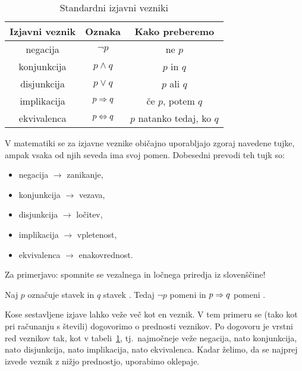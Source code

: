 		\begin{table}[!ht]
			\centering
			\begin{tabular}{|ccc|}
				\hline
				\textbf{Izjavni veznik} & \textbf{Oznaka} & \textbf{Kako preberemo} \\
				\hline
				negacija & $\lnot{p}$ & ne $p$ \\
				konjunkcija & $p \land q$ & $p$ in $q$ \\
				disjunkcija & $p \lor q$ & $p$ ali $q$ \\
				implikacija & $p \Rightarrow q$ & če $p$, potem $q$ \\
				ekvivalenca & $p \Leftrightarrow q$ & $p$ natanko tedaj, ko $q$ \\
				\hline
			\end{tabular}
			\caption{Standardni izjavni vezniki}\label{TABELA: Standardni izjavni vezniki}
		\end{table}
		
		\begin{opomba}
			V matematiki se za izjavne veznike običajno uporabljajo zgoraj navedene tujke, ampak vsaka od njih seveda ima svoj pomen. Dobesedni prevodi teh tujk so:
			\begin{itemize}
				\item
					negacija $\to$ zanikanje,
				\item
					konjunkcija $\to$ vezava,
				\item
					disjunkcija $\to$ ločitev,
				\item
					implikacija $\to$ vpletenost,
				\item
					ekvivalenca $\to$ enakovrednost.
			\end{itemize}
			Za primerjavo: spomnite se vezalnega in ločnega priredja iz slovenščine!
		\end{opomba}
		
		\begin{zgled}
			Naj $p$ označuje stavek  in $q$ stavek . Tedaj $\lnot{p}$ pomeni  in $p \Rightarrow q$ pomeni .
		\end{zgled}
		
		Kose sestavljene izjave lahko veže več kot en veznik. V tem primeru se (tako kot pri računanju s števili) dogovorimo o prednosti veznikov. Po dogovoru je vrstni red veznikov tak, kot v tabeli~\ref{TABELA: Standardni izjavni vezniki}, tj.~najmočneje veže negacija, nato konjunkcija, nato disjunkcija, nato implikacija, nato ekvivalenca. Kadar želimo, da se najprej izvede veznik z nižjo prednostjo, uporabimo oklepaje.
		
